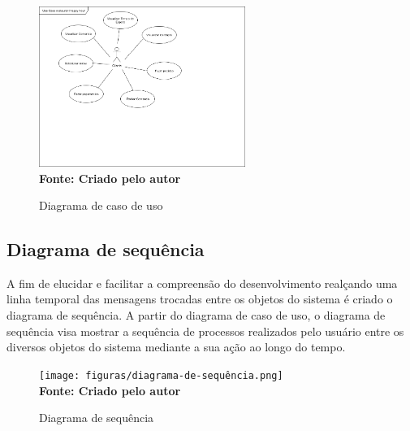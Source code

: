 \begin{figure}[ht]
	\centering	
	\caption[\hspace{0.1cm}]{Diagrama de caso de uso}
	\vspace{-0.4cm}
	\includegraphics[width=0.6\textwidth]{figuras/diagrama-de-caso-de-uso.png}
	 \vspace{-0.2cm}
	\\\textbf{\footnotesize Fonte: Criado pelo autor }
	\label{fig:casodeuso}
\end{figure}
\vspace{-0.5cm}

\subsection{\esp Diagrama de sequência}

A fim de elucidar e facilitar a compreensão do desenvolvimento realçando uma linha temporal das mensagens trocadas entre os objetos do sistema é criado o diagrama de sequência. A partir do diagrama de caso de uso, o diagrama de sequência visa mostrar a sequência de processos realizados pelo usuário entre os diversos objetos do sistema mediante a sua ação ao longo do tempo.

\begin{figure}[ht]
	\centering	
	\caption[\hspace{0.1cm}]{Diagrama de sequência}
	\vspace{-0.4cm}
	\texttt{[image: figuras/diagrama-de-sequência.png]}
	 \vspace{-0.2cm}
	\\\textbf{\footnotesize Fonte: Criado pelo autor }
	\label{fig:casodeuso}
\end{figure}
\vspace{-0.5cm}


